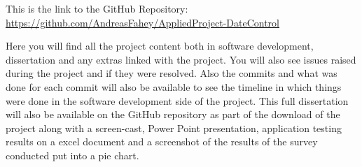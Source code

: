 This is the link to the GitHub Repository:
\newline
\url{https://github.com/AndreasFahey/AppliedProject-DateControl}
\newline

Here you will find all the project content both in software development, dissertation and any extras linked with the project.
You will also see issues raised during the project and if they were resolved. Also the commits and what was done for each commit will also be available to see the timeline in which things were done in the software development side of the project. This full dissertation will also be available on the GitHub repository as part of the download of the project along with a screen-cast, Power Point presentation, application testing results on a excel document and a screenshot of the results of the survey conducted put into a pie chart. 



